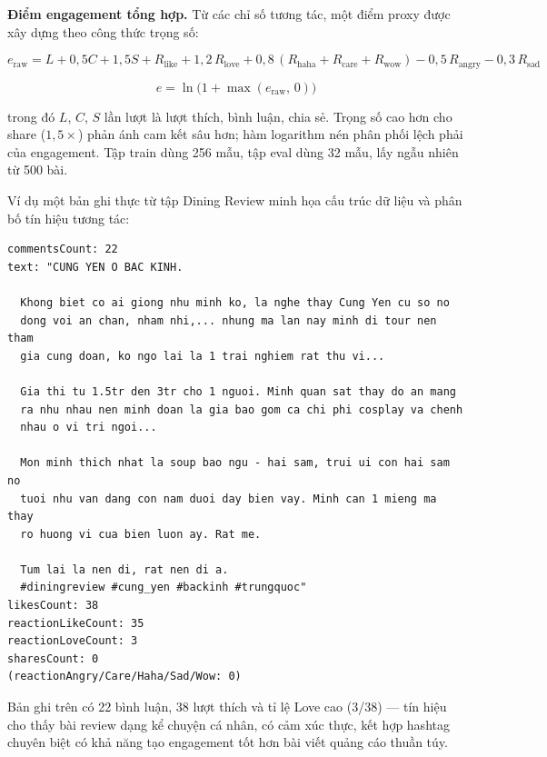\textbf{Điểm engagement tổng hợp.} Từ các chỉ số tương tác, một
điểm proxy được xây dựng theo công thức trọng số:

\begin{equation}
  e_{\text{raw}} = L + 0{,}5C + 1{,}5S
    + R_{\text{like}} + 1{,}2\,R_{\text{love}}
    + 0{,}8\,(R_{\text{haha}} + R_{\text{care}} + R_{\text{wow}})
    - 0{,}5\,R_{\text{angry}} - 0{,}3\,R_{\text{sad}}
  \label{eq:engage-raw}
\end{equation}

\begin{equation}
  e = \ln\!\bigl(1 + \max(e_{\text{raw}},\, 0)\bigr)
  \label{eq:engage-log}
\end{equation}

trong đó $L$, $C$, $S$ lần lượt là lượt thích, bình luận, chia sẻ.
Trọng số cao hơn cho share ($1{,}5\times$) phản ánh cam kết sâu hơn;
hàm logarithm nén phân phối lệch phải của engagement. Tập train
dùng 256 mẫu, tập eval dùng 32 mẫu, lấy ngẫu nhiên từ 500 bài.

Ví dụ một bản ghi thực từ tập Dining Review minh họa cấu trúc dữ liệu
và phân bố tín hiệu tương tác:

\begin{lstlisting}[language={},basicstyle=\scriptsize\ttfamily,
  breaklines=true,frame=single,numbers=none,
  caption={Ví dụ một dòng trong tập Dining Review (CSV, rút gọn).}]
commentsCount: 22
text: "CUNG YEN O BAC KINH.

  Khong biet co ai giong nhu minh ko, la nghe thay Cung Yen cu so no
  dong voi an chan, nham nhi,... nhung ma lan nay minh di tour nen tham
  gia cung doan, ko ngo lai la 1 trai nghiem rat thu vi...

  Gia thi tu 1.5tr den 3tr cho 1 nguoi. Minh quan sat thay do an mang
  ra nhu nhau nen minh doan la gia bao gom ca chi phi cosplay va chenh
  nhau o vi tri ngoi...

  Mon minh thich nhat la soup bao ngu - hai sam, trui ui con hai sam no
  tuoi nhu van dang con nam duoi day bien vay. Minh can 1 mieng ma thay
  ro huong vi cua bien luon ay. Rat me.

  Tum lai la nen di, rat nen di a.
  #diningreview #cung_yen #backinh #trungquoc"
likesCount: 38
reactionLikeCount: 35
reactionLoveCount: 3
sharesCount: 0
(reactionAngry/Care/Haha/Sad/Wow: 0)
\end{lstlisting}

Bản ghi trên có 22 bình luận, 38 lượt thích và tỉ lệ Love cao (3/38)
--- tín hiệu cho thấy bài review dạng kể chuyện cá nhân, có cảm xúc
thực, kết hợp hashtag chuyên biệt có khả năng tạo engagement tốt hơn
bài viết quảng cáo thuần túy.

